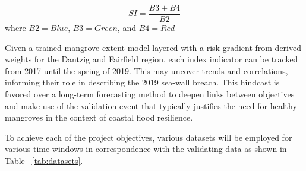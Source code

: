 \documentclass[project-plan]{report-template}
\begin{document}
\begin{equation}
    \label{eq:si}
    SI = \frac{B3 + B4}{B2}
\end{equation}
where $B2 = Blue$, $B3 = Green$, and $B4 = Red$ 

Given a trained mangrove extent model layered with a risk gradient from derived weights for the Dantzig and Fairfield region, each index indicator can be tracked from 2017 until the spring of 2019. This may uncover trends and correlations, informing their role in describing the 2019 sea-wall breach. This hindcast is favored over a long-term forecasting method to deepen links between objectives and make use of the validation event that typically justifies the need for healthy mangroves in the context of coastal flood resilience.

To achieve each of the project objectives, various datasets will be employed for various time windows in correspondence with the validating data as shown in Table ~\ref{tab:datasets}.
\end{document}
